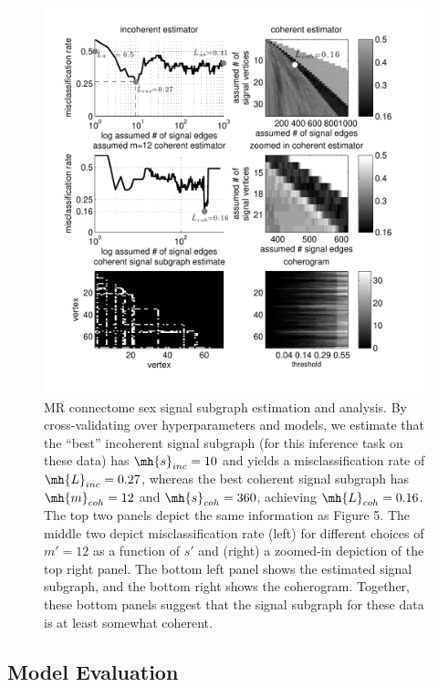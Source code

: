 \documentclass[10pt,journal,cspaper,compsoc]{IEEEtran}
\begin{document}


\begin{figure}[htbp]
	\centering
		\includegraphics[width=1.0\linewidth]{../figs/BLSA0317_Count_Lhats_results.pdf}
	\caption{MR connectome sex signal subgraph estimation and analysis. By cross-validating over hyperparameters and models, we estimate that the ``best'' incoherent signal subgraph (for this inference task on these data) has $\mh{s}_{inc}=10$ and yields a misclassification rate of $\mh{L}_{inc}=0.27$, whereas the best coherent signal subgraph has $\mh{m}_{coh}=12$ and $\mh{s}_{coh}=360$, achieving $\mh{L}_{coh}=0.16$.  The top two panels depict the same information as Figure 5.  The middle two depict misclassification rate (left) for different choices of $m'=12$ as a function of $s'$ and (right) a zoomed-in depiction of the top right panel. The bottom left panel shows the estimated signal subgraph, and the bottom right shows the coherogram.  Together, these bottom panels suggest that the signal subgraph for these data is at least somewhat coherent.}
	\label{fig:data}
\end{figure}

\subsection{Model Evaluation} %
\label{sub:model_checking}
\end{document}
